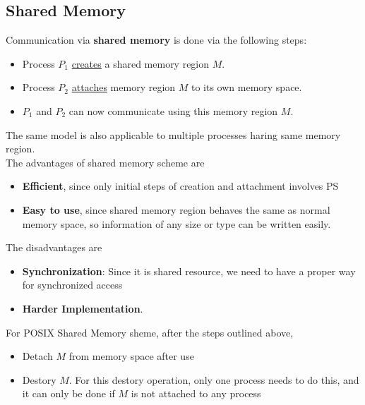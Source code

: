 \documentclass[12pt]{article}
\theoremstyle{definition}
\begin{document}
\subsection{Shared Memory}
Communication via \textbf{shared memory} is done via the following steps:
\begin{itemize}
  \item Process $P_1$ \underline{creates} a shared memory region $M$.
  \item Process $P_2$ \underline{attaches} memory region $M$ to its own memory space.
  \item $P_1$ and $P_2$ can now communicate using this memory region $M$.
\end{itemize}
The same model is also applicable to multiple processes haring same memory region.\\
The advantages of shared memory scheme are
\begin{itemize}
  \item \textbf{Efficient}, since only initial steps of creation and attachment involves PS
  \item \textbf{Easy to use}, since shared memory region behaves the same as normal memory space, so information of any size or type can be written easily.
\end{itemize}
The disadvantages are
\begin{itemize}
  \item \textbf{Synchronization}: Since it is shared resource, we need to have a proper way for synchronized access
  \item \textbf{Harder Implementation}.
\end{itemize}
For POSIX Shared Memory sheme, after the steps outlined above,
\begin{itemize}
  \item Detach $M$ from memory space after use
  \item Destory $M$. For this destory operation, only one process needs to do this, and it can only be done if $M$ is not attached to any process
\end{itemize}
\end{document}

